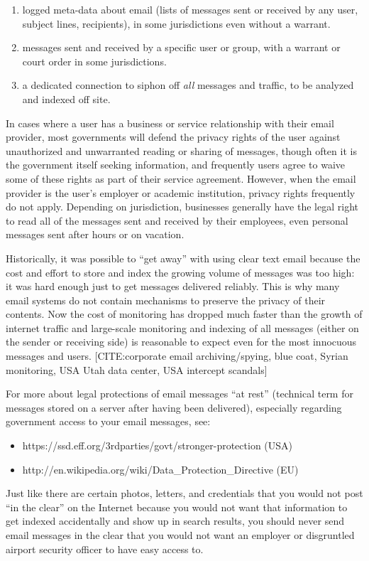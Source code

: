 \begin{enumerate}[1.]
\item
  logged meta-data about email (lists of messages sent or received by
  any user, subject lines, recipients), in some jurisdictions even
  without a warrant.
\item
  messages sent and received by a specific user or group, with a warrant
  or court order in some jurisdictions.
\item
  a dedicated connection to siphon off \emph{all} messages and traffic,
  to be analyzed and indexed off site.
\end{enumerate}
In cases where a user has a business or service relationship with their
email provider, most governments will defend the privacy rights of the
user against unauthorized and unwarranted reading or sharing of
messages, though often it is the government itself seeking information,
and frequently users agree to waive some of these rights as part of
their service agreement. However, when the email provider is the user's
employer or academic institution, privacy rights frequently do not
apply. Depending on jurisdiction, businesses generally have the legal
right to read all of the messages sent and received by their employees,
even personal messages sent after hours or on vacation.

Historically, it was possible to ``get away'' with using clear text
email because the cost and effort to store and index the growing volume
of messages was too high: it was hard enough just to get messages
delivered reliably. This is why many email systems do not contain
mechanisms to preserve the privacy of their contents. Now the cost of
monitoring has dropped much faster than the growth of internet traffic
and large-scale monitoring and indexing of all messages (either on the
sender or receiving side) is reasonable to expect even for the most
innocuous messages and users. {[}CITE:corporate email archiving/spying,
blue coat, Syrian monitoring, USA Utah data center, USA intercept
scandals{]}

For more about legal protections of email messages ``at rest''
(technical term for messages stored on a server after having been
delivered), especially regarding government access to your email
messages, see:

\begin{itemize}
\item
  https://ssd.eff.org/3rdparties/govt/stronger-protection (USA)
\item
  http://en.wikipedia.org/wiki/Data\_Protection\_Directive (EU)
\end{itemize}
Just like there are certain photos, letters, and credentials that you
would not post ``in the clear'' on the Internet because you would not
want that information to get indexed accidentally and show up in search
results, you should never send email messages in the clear that you
would not want an employer or disgruntled airport security officer to
have easy access to.

